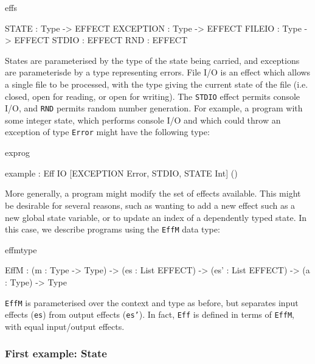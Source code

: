 \begin{SaveVerbatim}{effs}

STATE     : Type -> EFFECT
EXCEPTION : Type -> EFFECT
FILEIO    : Type -> EFFECT
STDIO     : EFFECT
RND       : EFFECT

\end{SaveVerbatim}

\noindent
States are parameterised by the type of the state being carried, and exceptions
are parameterisde by a type representing errors. File I/O is an effect which
allows a single file to be processed, with the type giving the current state
of the file (i.e. closed, open for reading, or open for writing). The
\texttt{STDIO} effect permits console I/O, and \texttt{RND} permits random
number generation.
%
For example, a program with some integer state, which performs console I/O 
and which could throw
an exception of type \texttt{Error} might have the following type:

\noindent
\begin{SaveVerbatim}{exprog}

 example : Eff IO [EXCEPTION Error, STDIO, STATE Int] ()

\end{SaveVerbatim}

\noindent
More generally, a program might modify the set of effects available. This
might be desirable for several reasons, such as wanting to add a new effect
such as a new global state variable, or to update an index of a dependently
typed state. In this case, we describe programs using the \texttt{EffM}
data type:

\begin{SaveVerbatim}{effmtype}

EffM : (m   : Type -> Type) -> 
       (es  : List EFFECT) -> 
       (es' : List EFFECT) -> 
       (a   : Type) -> Type

\end{SaveVerbatim}

\noindent
\texttt{EffM} is parameterised over the context and type as before,
but separates input effects (\texttt{es}) from output effects (\texttt{es'}).
In fact, \texttt{Eff} is defined in terms of \texttt{EffM}, with equal
input/output effects.

\subsubsection{First example: State}

